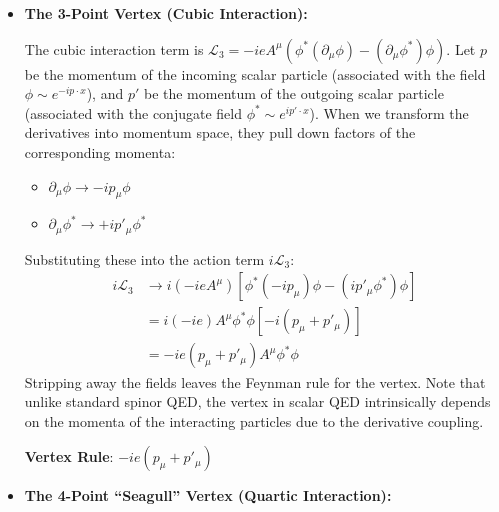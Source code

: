 \begin{itemize}
    \item \textbf{The 3-Point Vertex (Cubic Interaction):}


          The cubic interaction term is $\mathcal{L}_3 = -ieA^\mu \left( \phi^*(\partial_\mu\phi) - (\partial_\mu\phi^*)\phi \right)$.
          Let $p$ be the momentum of the incoming scalar particle (associated with the field $\phi \sim e^{-ip \cdot x}$), and $p'$ be the momentum of the outgoing scalar particle (associated with the conjugate field $\phi^* \sim e^{ip' \cdot x}$).
          When we transform the derivatives into momentum space, they pull down factors of the corresponding momenta:
          \begin{itemize}
              \item $\partial_\mu \phi \to -i p_\mu \phi$
              \item $\partial_\mu \phi^* \to +i p'_\mu \phi^*$
          \end{itemize}
          Substituting these into the action term $i\mathcal{L}_3$:
          \[
              \begin{aligned}
                  i \mathcal{L}_3 & \to i (-ieA^\mu) \left[ \phi^* (-ip_\mu) \phi - (ip'_\mu \phi^*) \phi \right] \\
                                  & = i (-ie) A^\mu \phi^* \phi \left[ -i(p_\mu + p'_\mu) \right]                 \\
                                  & = -ie (p_\mu + p'_\mu) A^\mu \phi^* \phi
              \end{aligned}
          \]
          Stripping away the fields leaves the Feynman rule for the vertex. Note that unlike standard spinor QED, the vertex in scalar QED intrinsically depends on the momenta of the interacting particles due to the derivative coupling.
          \begin{center}
              \textbf{Vertex Rule}: $-ie(p_\mu  + p'_\mu)$
          \end{center}

    \item \textbf{The 4-Point ``Seagull'' Vertex (Quartic Interaction):}



\end{itemize}
